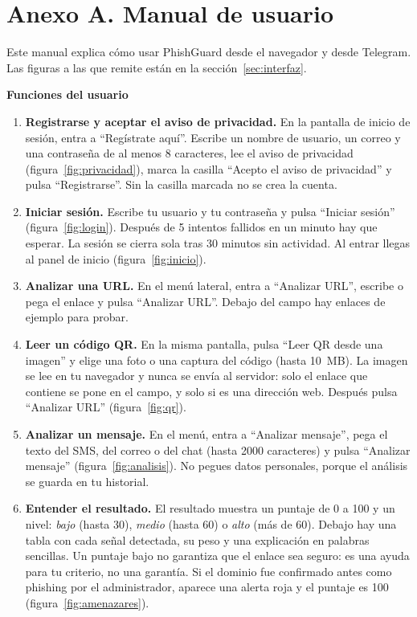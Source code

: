 \documentclass[journal,onecolumn,12pt,draftclsnofoot]{IEEEtran}
\newcommand{\apartado}[1]{\par\medskip\noindent\textbf{#1}\par\smallskip}
\begin{document}
\section*{Anexo A. Manual de usuario}

Este manual explica cómo usar PhishGuard desde el navegador y desde Telegram. Las figuras a las que remite están en la sección~\ref{sec:interfaz}.

\apartado{Funciones del usuario}

\begin{enumerate}
  \item \textbf{Registrarse y aceptar el aviso de privacidad.} En la pantalla de inicio de sesión, entra a ``Regístrate aquí''. Escribe un nombre de usuario, un correo y una contraseña de al menos 8 caracteres, lee el aviso de privacidad (figura~\ref{fig:privacidad}), marca la casilla ``Acepto el aviso de privacidad'' y pulsa ``Registrarse''. Sin la casilla marcada no se crea la cuenta.
  \item \textbf{Iniciar sesión.} Escribe tu usuario y tu contraseña y pulsa ``Iniciar sesión'' (figura~\ref{fig:login}). Después de 5 intentos fallidos en un minuto hay que esperar. La sesión se cierra sola tras 30 minutos sin actividad. Al entrar llegas al panel de inicio (figura~\ref{fig:inicio}).
  \item \textbf{Analizar una URL.} En el menú lateral, entra a ``Analizar URL'', escribe o pega el enlace y pulsa ``Analizar URL''. Debajo del campo hay enlaces de ejemplo para probar.
  \item \textbf{Leer un código QR.} En la misma pantalla, pulsa ``Leer QR desde una imagen'' y elige una foto o una captura del código (hasta 10~MB). La imagen se lee en tu navegador y nunca se envía al servidor: solo el enlace que contiene se pone en el campo, y solo si es una dirección web. Después pulsa ``Analizar URL'' (figura~\ref{fig:qr}).
  \item \textbf{Analizar un mensaje.} En el menú, entra a ``Analizar mensaje'', pega el texto del SMS, del correo o del chat (hasta 2000 caracteres) y pulsa ``Analizar mensaje'' (figura~\ref{fig:analisis}). No pegues datos personales, porque el análisis se guarda en tu historial.
  \item \textbf{Entender el resultado.} El resultado muestra un puntaje de 0 a 100 y un nivel: \emph{bajo} (hasta 30), \emph{medio} (hasta 60) o \emph{alto} (más de 60). Debajo hay una tabla con cada señal detectada, su peso y una explicación en palabras sencillas. Un puntaje bajo no garantiza que el enlace sea seguro: es una ayuda para tu criterio, no una garantía. Si el dominio fue confirmado antes como phishing por el administrador, aparece una alerta roja y el puntaje es 100 (figura~\ref{fig:amenazares}).

\end{enumerate}
\end{document}

